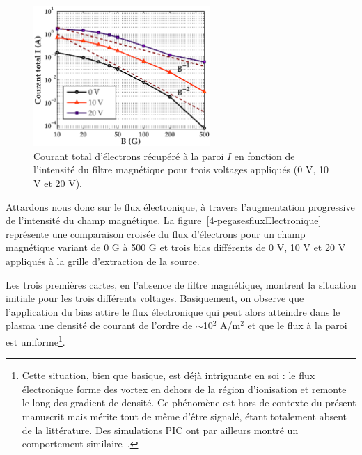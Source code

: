 \begin{refsection}
\begin{figure}[!htbp]
	\centering
	\includegraphics[width=0.6\textwidth]{figures/4-pegasesVarMagCourantParoi.eps}
	{\caption{Courant total d'électrons récupéré à la paroi $I$ en fonction de l'intensité du filtre magnétique pour trois
	voltages appliqués (0 V, 10 V et 20 V). }
	\label{pegasesVarMagCourantParoi}}
	\end{figure}

Attardons nous donc sur le flux électronique, à travers l'augmentation
progressive de l'intensité du champ magnétique. La
figure~\ref{4-pegasesfluxElectronique} représente une comparaison croisée du
flux d'électrons pour un champ magnétique variant de 0 G à 500 G et trois bias
différents de 0 V, 10 V et 20 V appliqués à la grille d'extraction de la source. 

Les trois premières cartes, en l'absence de filtre magnétique, montrent la
situation initiale pour les trois différents voltages. Basiquement, on observe
que l'application du bias attire le flux électronique qui peut alors atteindre
dans le plasma une densité de courant de l'ordre de $\sim$10$^2$ A/m$^2$ et que
le flux à la paroi est uniforme\footnote{Cette
situation, bien que basique, est déjà intriguante en soi : le flux électronique
forme des vortex en dehors de la région d'ionisation et remonte le long des
gradient de densité. Ce phénomène est hors de contexte du présent
manuscrit mais mérite tout de même d'être signalé, étant totalement absent de
la littérature.
Des simulations PIC ont par ailleurs montré un comportement
similaire~\parencite{PIC3D}.}.


\end{refsection}
